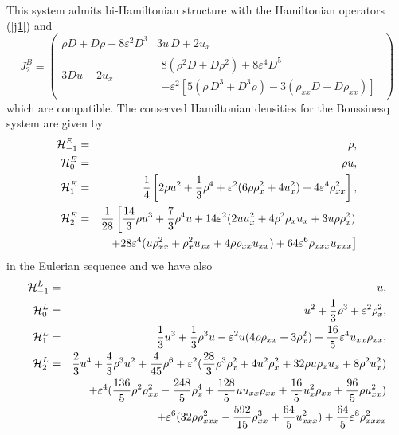 \documentclass[a4paper,12pt]{article}
\begin{document}
This system admits bi-Hamiltonian structure \cite{olver} with the
Hamiltonian operators (\ref{j1}) and
\begin{equation}
J^{B}_{2} = \left( \begin{array}{cc}   \rho D + D \rho   - 8
\varepsilon^{2} D^{3} & 3 u \, D + 2 u_{x}
\\[4mm] 3 D u - 2 u_{x} &  \begin{array}{c} 8 ( \rho
^{2} D + D \rho^2 ) + 8 \varepsilon ^{4} D^{5} \\ - \varepsilon
^{2} [ 5 ( \rho \, D^{3} + D^3 \rho ) - 3 ( \rho_{xx} D + D
\rho_{xx} ) ]
\end{array}
\end{array} \right)
\end{equation}
which are compatible. The conserved Hamiltonian densities for the
Boussinesq system are given by
\begin{eqnarray}
{\cal H}_{-1}^{E} &=& \rho, \\
{\cal H}_{0}^{E} &=& \rho u, \\
{\cal H}_{1}^{E} &=&\frac{1}{4}\left[2\rho u^{2}+\frac{1}{3}\rho
^{4}+\varepsilon^{2}(6\rho \rho _{x}^{2}+4u_{x}^{2})+4\varepsilon ^{4}\rho _{xx}^{2}\right],
\nonumber \\
{\cal H}_{2}^{E} &=&\frac{1}{28}\left[\frac{14}{3}\rho
u^{3}+\frac{7}{3}\rho ^{4}u+14\varepsilon ^{2}(2uu_{x}^{2}+4\rho
^{2}\rho _{x}u_{x}+3u\rho \rho
_{x}^{2})\right. \label{bcomham} \\
&& \left. +28\varepsilon ^{4}(u\rho _{xx}^{2}+\rho
_{x}^{2}u_{xx}+4\rho \rho _{xx}u_{xx})+64\varepsilon ^{6}\rho
_{xxx}u_{xxx}\right]
\end{eqnarray}
in the Eulerian sequence and we have also
\begin{eqnarray}
{\cal H}_{-1}^{L} &=& u,  \\
{\cal H}_{0}^{L} &=& u^{2}+\frac{1}{3}\rho ^{3}+\varepsilon
^{2}\rho_{x}^{2} , \\
{\cal H}_{1}^{L} &=& \frac{1}{3}u^{3}+\frac{1}{3}\rho
^{3}u-\varepsilon ^{2}u(4\rho \rho _{xx}+3\rho
_{x}^{2})+\frac{16}{5}\varepsilon ^{4}u_{xx}\rho _{xx}, \label{boussham}\\
{\cal H}_{2}^{L} &=& \frac{2}{3}u^{4}+\frac{4}{3}\rho ^{3}u^{2}+\frac{4}{45}%
\rho ^{6}+\varepsilon ^{2}(\frac{28}{3}\rho ^{3}\rho
_{x}^{2}+4u^{2}\rho
_{x}^{2}+32\rho u\rho _{x}u_{x}+8\rho ^{2}u_{x}^{2}) \nonumber \\
&&+\varepsilon ^{4}(\frac{136}{5}\rho ^{2}\rho
_{xx}^{2}-\frac{248}{5}\rho
_{x}^{4}+\frac{128}{5}uu_{xx}\rho _{xx}+\frac{16}{5}u_{x}^{2}\rho _{xx}+%
\frac{96}{5}\rho u_{xx}^{2})  \\
&&+\varepsilon ^{6}(32\rho \rho _{xxx}^{2}-\frac{592}{15}\rho _{xx}^{3}+%
\frac{64}{5}u_{xxx}^{2})+\frac{64}{5}\varepsilon ^{8}
\rho_{xxxx}^{2} \nonumber
\end{eqnarray}
\end{document}
